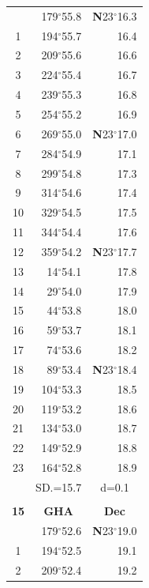 \documentclass[10pt, a4paper]{report}
\begin{document}
\begin{scriptsize}
\begin{tabular*}{0.2\textwidth}[t]{@{\extracolsep{\fill}}|c|rr|}
\hline\rule{0pt}{2.6ex}\noindent
0 & 179$^\circ$55.8 & \textbf{N}23$^\circ$16.3\\
1 & 194$^\circ$55.7 & 16.4\\
2 & 209$^\circ$55.6 & 16.6\\
3 & 224$^\circ$55.4 & \raisebox{0.24ex}{\boldmath$\cdot$~\boldmath$\cdot$~~}16.7\\
4 & 239$^\circ$55.3 & 16.8\\
5 & 254$^\circ$55.2 & 16.9\\[2Pt]
6 & 269$^\circ$55.0 & \textbf{N}23$^\circ$17.0\\
7 & 284$^\circ$54.9 & 17.1\\
8 & 299$^\circ$54.8 & 17.3\\
9 & 314$^\circ$54.6 & \raisebox{0.24ex}{\boldmath$\cdot$~\boldmath$\cdot$~~}17.4\\
10 & 329$^\circ$54.5 & 17.5\\
11 & 344$^\circ$54.4 & 17.6\\[2Pt]
12 & 359$^\circ$54.2 & \textbf{N}23$^\circ$17.7\\
13 & 14$^\circ$54.1 & 17.8\\
14 & 29$^\circ$54.0 & 17.9\\
15 & 44$^\circ$53.8 & \raisebox{0.24ex}{\boldmath$\cdot$~\boldmath$\cdot$~~}18.0\\
16 & 59$^\circ$53.7 & 18.1\\
17 & 74$^\circ$53.6 & 18.2\\[2Pt]
18 & 89$^\circ$53.4 & \textbf{N}23$^\circ$18.4\\
19 & 104$^\circ$53.3 & 18.5\\
20 & 119$^\circ$53.2 & 18.6\\
21 & 134$^\circ$53.0 & \raisebox{0.24ex}{\boldmath$\cdot$~\boldmath$\cdot$~~}18.7\\
22 & 149$^\circ$52.9 & 18.8\\
23 & 164$^\circ$52.8 & 18.9\\
\hline
\rule{0pt}{2.4ex} & \multicolumn{1}{c}{SD.=15.7} & \multicolumn{1}{c|}{d=0.1}\\
\hline
\multicolumn{1}{c}{}\\[-0.5ex]\hline
\multicolumn{1}{|c|}{\rule{0pt}{2.6ex}\textbf{15}} & \multicolumn{1}{c}{\textbf{GHA}} & \multicolumn{1}{c|}{\textbf{Dec}}\\
\hline\rule{0pt}{2.6ex}\noindent
0 & 179$^\circ$52.6 & \textbf{N}23$^\circ$19.0\\
1 & 194$^\circ$52.5 & 19.1\\
2 & 209$^\circ$52.4 & 19.2\\

\end{tabular*}
\end{scriptsize}
\end{document}
